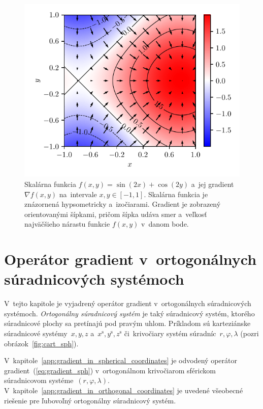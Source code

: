 \documentclass[a4paper, 12pt]{book}
\begin{document}
\begin{figure}[bt]
\centering
\includegraphics{./fig-gradient.pdf}
\caption{Skalárna funkcia $f(x, y) = \sin(2x) + \cos(2y)$ a~jej gradient 
$\nabla f(x, y)$ na~intervale $x, y \in [-1, 1]$.  Skalárna funkcia je 
znázornená hypsometricky a~izočiarami.  Gradient je zobrazený orientovanými 
šípkami, pričom šípka udáva smer a~veľkosť najväčšieho nárastu funkcie $f(x, 
y)$ v~danom bode.}
\label{fig:f_gradf}
\end{figure}






\chapter{Operátor gradient v~ortogonálnych súradnicových systémoch}
\label{app:gradient_in_orthogonal_systems}

V~tejto kapitole je vyjadrený operátor gradient v~ortogonálnych súradnicových 
systémoch.  \emph{Ortogonálny súradnicový systém} je taký súradnicový systém, 
ktorého súradnicové plochy sa pretínajú pod pravým uhlom.  Príkladom sú 
karteziánske súradnicové systémy~$x, y, z$ a~$x^\mathrm{s}, y^\mathrm{s}, 
z^\mathrm{s}$ či~krivočiary systém súradníc~$r, \varphi, \lambda$ (pozri 
obrázok~\ref{fig:cart_sph}).

V~kapitole~\ref{app:gradient_in_spherical_coordinates} je odvodený operátor 
gradient~(\ref{eq:gradient_sph}) v~ortogonálnom krivočiarom sférickom 
súradnicovom systéme~$(r, \varphi, \lambda)$.  
V~kapitole~\ref{app:gradient_in_orthogonal_coordinates} je uvedené všeobecné 
riešenie pre ľubovoľný ortogonálny súradnicový systém.
\end{document}
